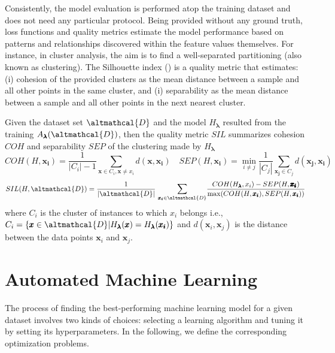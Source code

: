 Consistently, the model evaluation is performed atop the training dataset and does not need any particular protocol.
Being provided without any ground truth, loss functions and quality metrics estimate the model performance based on patterns and relationships discovered within the feature values themselves.
For instance, in cluster analysis, the aim is to find a well-separated partitioning (also known as clustering).
The Silhouette index () is a quality metric that estimates: (i) cohesion of the provided clusters as the mean distance between a sample and all other points in the same cluster, and (i) separability as the mean distance between a sample and all other points in the next nearest cluster.

\begin{example}\label{ex:sil}
    Given the dataset set $\altmathcal{D}$ and the model $H_{\pmb{\lambda}}$ resulted from the training $A_{\pmb{\lambda}}(\altmathcal{D})$, then the quality metric $SIL$ summarizes cohesion $COH$ and separability $SEP$ of the clustering made by $H_{\pmb{\lambda}}$
    \begin{equation*}
        COH(H, \pmb{x_i}) = \frac{1}{|C_{i}| - 1} \sum_{\pmb{x} \in C_{i}, \pmb{x} \neq x_i} d(\pmb{x}, \pmb{x_i}) \quad
        SEP(H, \pmb{x_i}) = \min_{i \neq j} \frac{1}{|C_j|} \sum_{\pmb{x_j} \in C_j} d(\pmb{x_j}, \pmb{x_i})
    \end{equation*}
    \begin{equation*}
        SIL(H, \altmathcal{D}) = \frac{1}{|\altmathcal{D}|}~\mathlarger{\sum}_{\pmb{x_i} \in \altmathcal{D}} \frac{COH(H_{\pmb{\lambda}}, x_i) - SEP(H, \pmb{\pmb{x_i}})}{\max(COH(H, \pmb{x_i}), SEP(H, \pmb{x_i}))}
    \end{equation*}
    where $C_i$ is the cluster of instances to which $x_i$ belongs i.e., $C_i = \{\pmb{x} \in \altmathcal{D} | H_{\pmb{\lambda}}(\pmb{x}) = H_{\pmb{\lambda}}(\pmb{x_i})\}$ and $d(\pmb{x}_i, \pmb{x}_j)$ is the distance between the data points $\pmb{x}_i$ and $\pmb{x}_j$.
\end{example}




\section{Automated Machine Learning}\label{automl-background-sec:automl}


The process of finding the best-performing machine learning model for a given dataset involves two kinds of choices: selecting a learning algorithm and tuning it by setting its hyperparameters.
In the following, we define the corresponding optimization problems.

